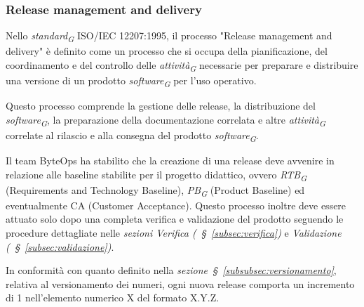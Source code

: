 \subsubsection{Release management and delivery}
Nello \textit{standard}\textsubscript{\textit{G}} ISO/IEC 12207:1995, il processo "Release management and delivery" è definito come un processo che si occupa della pianificazione, del coordinamento e del controllo delle \textit{attività}\textsubscript{\textit{G}} necessarie per preparare e distribuire una versione di un prodotto \textit{software}\textsubscript{\textit{G}} per l'uso operativo.

Questo processo comprende la gestione delle release, la distribuzione del \textit{software}\textsubscript{\textit{G}}, la preparazione della documentazione correlata e altre \textit{attività}\textsubscript{\textit{G}} correlate al rilascio e alla consegna del prodotto \textit{software}\textsubscript{\textit{G}}.

\vspace{0.2cm}

Il team ByteOps ha stabilito che la creazione di una release deve avvenire in relazione alle baseline stabilite per il progetto didattico, ovvero \textit{RTB}\textsubscript{\textit{G}} (Requirements and Technology Baseline), \textit{PB}\textsubscript{\textit{G}} (Product Baseline) ed eventualmente CA (Customer Acceptance). Questo processo inoltre deve essere attuato solo dopo una completa verifica e validazione del prodotto seguendo le procedure dettagliate nelle \textit{sezioni Verifica (~\S~\ref{subsec:verifica})} e \textit{Validazione (~\S~\ref{subsec:validazione})}.

\vspace{0.2cm}

In conformità con quanto definito nella \textit{sezione~\S~\ref{subsubsec:versionamento}}, relativa al versionamento dei numeri, ogni nuova release comporta un incremento di 1 nell'elemento numerico X del formato X.Y.Z.

